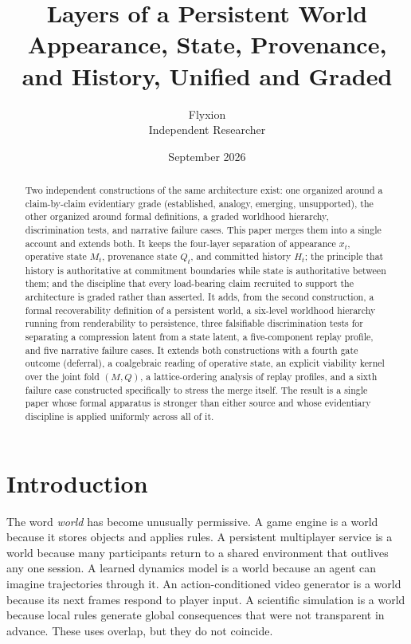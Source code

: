 \documentclass[11pt]{article}
\title{\textbf{Layers of a Persistent World}\\[0.3em]
\large Appearance, State, Provenance, and History, Unified and Graded}
\author{Flyxion\\Independent Researcher}
\date{September 2026}
\begin{document}
\maketitle

\begin{abstract}
\noindent Two independent constructions of the same architecture exist: one organized around a claim-by-claim evidentiary grade (established, analogy, emerging, unsupported), the other organized around formal definitions, a graded worldhood hierarchy, discrimination tests, and narrative failure cases. This paper merges them into a single account and extends both. It keeps the four-layer separation of appearance $x_t$, operative state $M_t$, provenance state $Q_t$, and committed history $H_t$; the principle that history is authoritative at commitment boundaries while state is authoritative between them; and the discipline that every load-bearing claim recruited to support the architecture is graded rather than asserted. It adds, from the second construction, a formal recoverability definition of a persistent world, a six-level worldhood hierarchy running from renderability to persistence, three falsifiable discrimination tests for separating a compression latent from a state latent, a five-component replay profile, and five narrative failure cases. It extends both constructions with a fourth gate outcome (deferral), a coalgebraic reading of operative state, an explicit viability kernel over the joint fold $(M,Q)$, a lattice-ordering analysis of replay profiles, and a sixth failure case constructed specifically to stress the merge itself. The result is a single paper whose formal apparatus is stronger than either source and whose evidentiary discipline is applied uniformly across all of it.
\end{abstract}

\tableofcontents

\section{Introduction}
\label{sec:intro}

The word \emph{world} has become unusually permissive. A game engine is a world because it stores objects and applies rules. A persistent multiplayer service is a world because many participants return to a shared environment that outlives any one session. A learned dynamics model is a world because an agent can imagine trajectories through it. An action-conditioned video generator is a world because its next frames respond to player input. A scientific simulation is a world because local rules generate global consequences that were not transparent in advance. These uses overlap, but they do not coincide.
\end{document}
